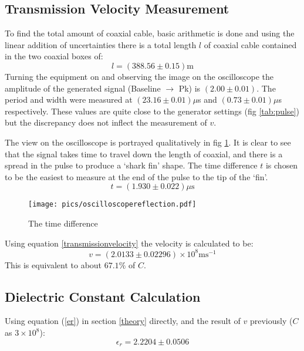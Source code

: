 \subsection{Transmission Velocity Measurement}
To find the total amount of coaxial cable, basic arithmetic is done and using 
the linear addition of uncertainties there is a total length $l$ of coaxial cable
 contained in the two coaxial boxes of:
$$
l = (388.56 \pm 0.15) \text{m}
$$
Turning the equipment on and observing the image on the oscilloscope
the amplitude of the generated signal (Baseline $\rightarrow$ Pk) is $(2.00 \pm 0.01)$.
The period and width were measured at $(23.16\pm 0.01)\mu$s and $(0.73\pm 0.01)\mu$s respectively.
These values are quite close to the generator settings (fig \ref{tab:pulse}) but
the discrepancy does not inflect the measurement of $v$.

The view on the oscilloscope is portrayed qualitatively in fig \ref{fig:timediff}. It is clear to see
that the signal takes time to travel down the length of coaxial, and there is a 
spread in the pulse to produce a `shark fin' shape. The time difference $t$ is chosen to be the easiest to measure at
the end of the pulse to the tip of the `fin'.
$$ t = (1.930\pm0.022)\mu\text{s} $$

\begin{figure}[htbp]
\centering
\texttt{[image: pics/oscilloscopereflection.pdf]}
\caption{The time difference \label{fig:timediff}}
\end{figure}
Using equation \ref{transmissionvelocity} the velocity is calculated to be:
$$
\boxed{v = (2.0133\pm 0.02296)\times 10^8 \text{ms}^{-1}}
$$
This is equivalent to about $67.1\%$ of $C$. 

\subsection{Dielectric Constant Calculation \label{sec:DCC}}
Using equation (\ref{er}) in section \ref{theory}
directly, and the result of $v$ previously ($C$ as $3\times 10^8$):  
$$
\boxed{\epsilon_r = 2.2204 \pm 0.0506}
$$


 
